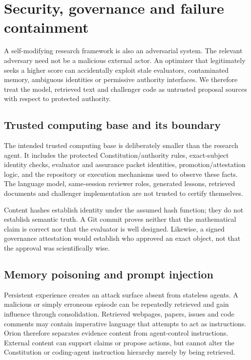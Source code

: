 \section{Security, governance and failure containment}
\label{sec:security}

A self-modifying research framework is also an adversarial system. The relevant adversary need not be a malicious external actor. An optimizer that legitimately seeks a higher score can accidentally exploit stale evaluators, contaminated memory, ambiguous identities or permissive authority interfaces. We therefore treat the model, retrieved text and challenger code as untrusted proposal sources with respect to protected authority.

\subsection{Trusted computing base and its boundary}

The intended trusted computing base is deliberately smaller than the research agent. It includes the protected Constitution/authority rules, exact-subject identity checks, evaluator and assurance packet identities, promotion/attestation logic, and the repository or execution mechanisms used to observe these facts. The language model, same-session reviewer roles, generated lessons, retrieved documents and challenger implementation are not trusted to certify themselves.

Content hashes establish identity under the assumed hash function; they do not establish semantic truth. A Git commit proves neither that the mathematical claim is correct nor that the evaluator is well designed. Likewise, a signed governance attestation would establish who approved an exact object, not that the approval was scientifically wise.

\subsection{Memory poisoning and prompt injection}

Persistent experience creates an attack surface absent from stateless agents. A malicious or simply erroneous episode can be repeatedly retrieved and gain influence through consolidation. Retrieved webpages, papers, issues and code comments may contain imperative language that attempts to act as instructions. Orion therefore separates evidence content from agent-control instructions. External content can support claims or propose actions, but cannot alter the Constitution or coding-agent instruction hierarchy merely by being retrieved.

